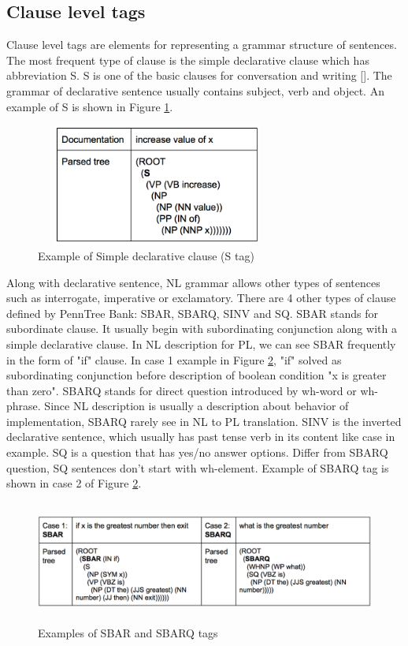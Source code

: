 \subsection{Clause level tags}
Clause level tags are elements for representing a grammar structure of sentences. The most frequent type of clause is the simple declarative clause which has abbreviation S. S is one of the basic clauses for conversation and writing [\cite{Cambridge:STag}]. The grammar of declarative sentence usually contains subject, verb and object. An example of S is shown in Figure \ref{fig:StagExample}. \\
\begin{figure}[htp]
	\centering
	\includegraphics[width=8cm,height=4cm]{resources/fig_stag_example}
	\caption[Example of Simple declarative clause (S tag)] {Example of Simple declarative clause (S tag)}
	\label{fig:StagExample}
\end{figure}
Along with declarative sentence, NL grammar allows other types of sentences such as interrogate, imperative or exclamatory. There are 4 other types of clause defined by PennTree Bank: SBAR, SBARQ, SINV and SQ. SBAR stands for subordinate clause. It usually begin with subordinating conjunction along with a simple declarative clause. In NL description for PL, we can see SBAR frequently in the form of "if" clause. In case 1 example in Figure \ref{fig:SBARSBARQTagExample}, "if" solved as subordinating conjunction before description of boolean condition "x is greater than zero". SBARQ stands for direct question introduced by wh-word or wh-phrase. Since NL description is usually a description about behavior of implementation, SBARQ rarely see in NL to PL translation. SINV is the inverted declarative sentence, which usually has past tense verb in its content like case in example. SQ is a question that has yes/no answer options. Differ from SBARQ question, SQ sentences don't start with wh-element. Example of SBARQ tag is shown in case 2 of Figure \ref{fig:SBARSBARQTagExample}. 

\begin{figure}[htp]
	\centering
	\includegraphics[width=14cm,height=4cm]{resources/fig_sbar_sbarq_2examples}
	\caption[Examples of SBAR and SBARQ tags] {Examples of SBAR and SBARQ tags}
	\label{fig:SBARSBARQTagExample}
\end{figure}

